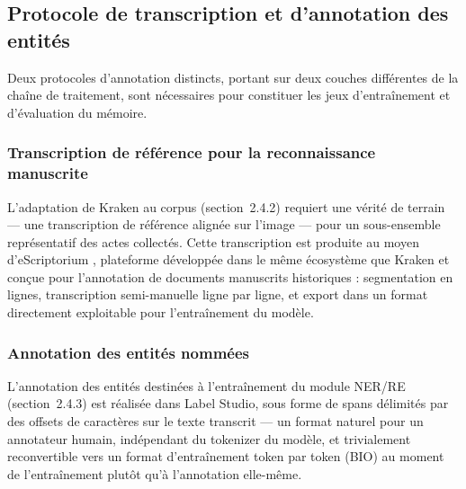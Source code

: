 \subsection{Protocole de transcription et d'annotation des entités}

Deux protocoles d'annotation distincts, portant sur deux couches différentes de la chaîne de traitement, sont nécessaires pour constituer les jeux d'entraînement et d'évaluation du mémoire.

\subsubsection*{Transcription de référence pour la reconnaissance manuscrite}

L'adaptation de Kraken au corpus (section~2.4.2) requiert une vérité de terrain --- une transcription de référence alignée sur l'image --- pour un sous-ensemble représentatif des actes collectés.
Cette transcription est produite au moyen d'eScriptorium \cite{kiessling2019escriptorium}, plateforme développée dans le même écosystème que Kraken et conçue pour l'annotation de documents manuscrits historiques : segmentation en lignes, transcription semi-manuelle ligne par ligne, et export dans un format directement exploitable pour l'entraînement du modèle.

\subsubsection*{Annotation des entités nommées}

L'annotation des entités destinées à l'entraînement du module NER/RE (section~2.4.3) est réalisée dans Label Studio, sous forme de spans délimités par des offsets de caractères sur le texte transcrit --- un format naturel pour un annotateur humain, indépendant du tokenizer du modèle, et trivialement reconvertible vers un format d'entraînement token par token (BIO) au moment de l'entraînement plutôt qu'à l'annotation elle-même.

